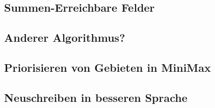 \documentclass[12pt]{beamer}
\begin{document}
\subsection{Summen-Erreichbare Felder} \begin{frame}\end{frame}
\subsection{Anderer Algorithmus?} \begin{frame}\end{frame}
\subsection{Priorisieren von Gebieten in MiniMax} \begin{frame}\end{frame}
\subsection{Neuschreiben in besseren Sprache} \begin{frame}\end{frame}
\end{document}
